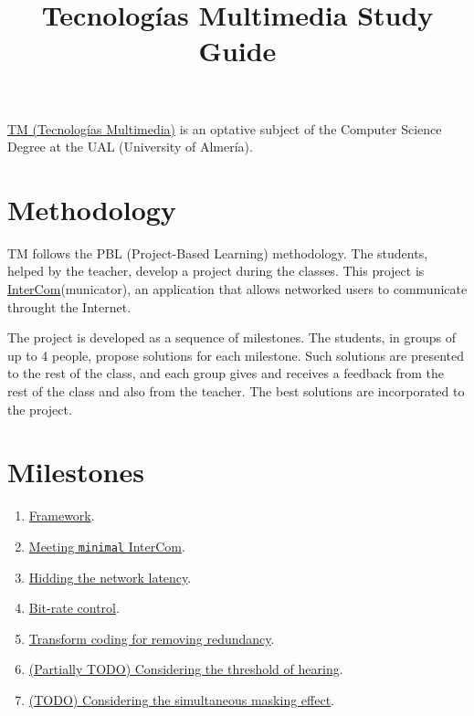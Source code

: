 
\title{Tecnologías Multimedia \newline Study Guide}

\maketitle

\href{https://www.ual.es/estudios/grados/presentacion/plandeestudios/asignatura/4015/40154321}{TM
  (Tecnologías Multimedia)} is an optative subject of the Computer
Science Degree at the UAL (University of Almería).

\section{Methodology}
TM follows the PBL (Project-Based Learning) methodology. The students,
helped by the teacher, develop a project during the classes. This
project
is \href{https://github.com/Tecnologias-multimedia/intercom}{InterCom}(municator),
an application that allows networked users to communicate throught
the Internet.

The project is developed as a sequence of milestones. The students, in
groups of up to 4 people, propose solutions for each milestone. Such
solutions are presented to the rest of the class, and each group gives
and receives a feedback from the rest of the class and also from the
teacher. The best solutions are incorporated to the project.

\section{Milestones}

\begin{enumerate}
\item \href{https://tecnologias-multimedia.github.io/study_guide/framework/}{Framework}.
\item \href{https://tecnologias-multimedia.github.io/study_guide/minimal/}{Meeting \texttt{minimal} InterCom}.
\item \href{https://tecnologias-multimedia.github.io/study_guide/latency/}{Hidding the network latency}.
\item \href{https://tecnologias-multimedia.github.io/study_guide/BR_control/}{Bit-rate control}.
\item \href{https://tecnologias-multimedia.github.io/study_guide/transform_coding/}{Transform coding for removing redundancy}.
\item \href{https://tecnologias-multimedia.github.io/study_guide/threshold_of_hearing/}{(Partially TODO) Considering the threshold of hearing}.
\item \href{https://tecnologias-multimedia.github.io/study_guide/15-simultaneous_masking/}{(TODO) Considering the simultaneous masking effect}.
\end{enumerate}

